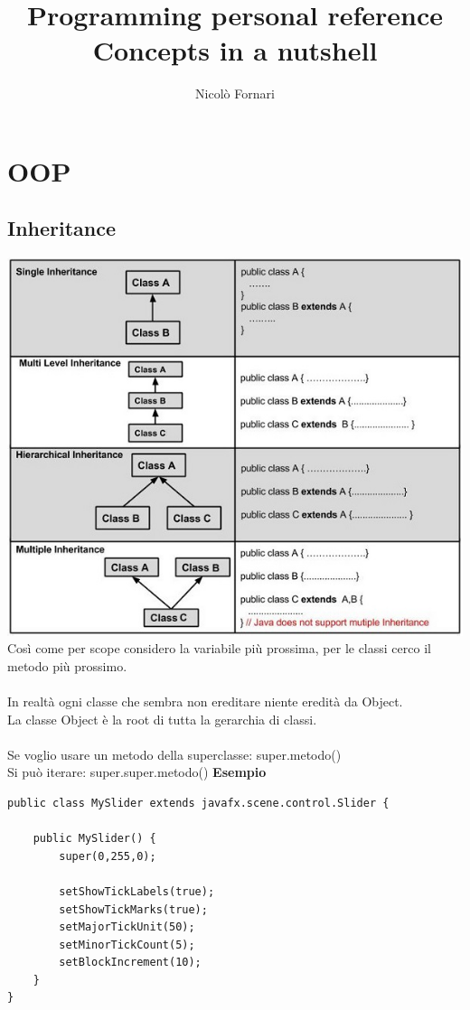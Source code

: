 \documentclass[10pt,a4paper]{book}
\title{Programming personal reference\\ \Large Concepts in a nutshell}
\author{Nicolò Fornari}
\begin{document}
\maketitle
\chapter{OOP}
\section{Inheritance}
\includegraphics[scale=0.7]{img/inheritance.jpg}
\newline
Così come per scope considero la variabile più prossima, per le classi cerco il metodo più prossimo.\\\\
In realtà ogni classe che sembra non ereditare niente eredità da Object.\\
La classe Object è la root di tutta la gerarchia di classi.\\\\
Se voglio usare un metodo della superclasse: super.metodo()\\
Si può iterare: super.super.metodo()
\newpage
\textbf{Esempio}\\
\begin{verbatim}
public class MySlider extends javafx.scene.control.Slider {
    
    public MySlider() {
        super(0,255,0);
    
        setShowTickLabels(true);
        setShowTickMarks(true);
        setMajorTickUnit(50);
        setMinorTickCount(5);
        setBlockIncrement(10);
    }
}
\end{verbatim}
\newpage
\end{document}
